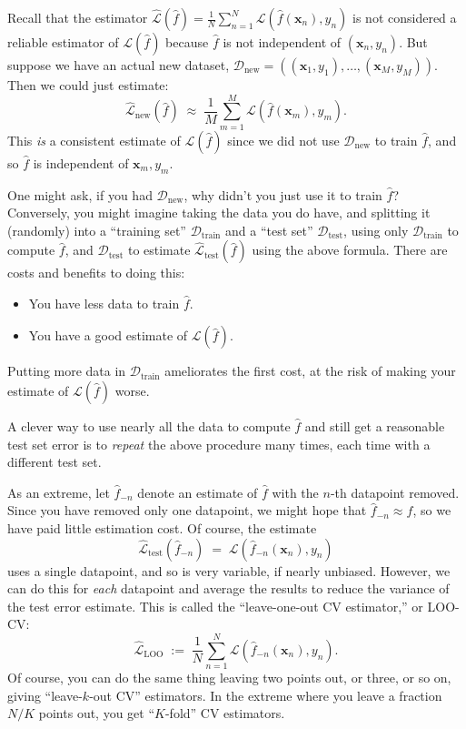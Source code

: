 Recall that the estimator
$\hat{\mathcal{L}}(\hat{f}) = \frac{1}{N}\sum_{n=1}^{N}
\mathcal{L}(\hat{f}(\boldsymbol{x}_n), y_n)$ is not considered a
reliable estimator of $\mathcal{L}(\hat{f})$ because $\hat{f}$ is
not independent of $(\boldsymbol{x}_n, y_n)$. But suppose we have
an actual new dataset,
$\mathcal{D}_{\text{new}} = ((\boldsymbol{x}_1, y_1), \ldots,
(\boldsymbol{x}_M, y_M))$. Then we could just estimate:
\[
  \hat{\mathcal{L}}_{\text{new}}(\hat{f})
  \;\approx\; \frac{1}{M}\sum_{m=1}^{M}
  \mathcal{L}(\hat{f}(\boldsymbol{x}_m), y_m).
\]
This \emph{is} a consistent estimate of $\mathcal{L}(\hat{f})$ since
we did not use $\mathcal{D}_{\text{new}}$ to train $\hat{f}$, and so
$\hat{f}$ is independent of $\boldsymbol{x}_m, y_m$.

One might ask, if you had $\mathcal{D}_{\text{new}}$, why didn't you
just use it to train $\hat{f}$? Conversely, you might imagine taking
the data you do have, and splitting it (randomly) into a ``training
set'' $\mathcal{D}_{\text{train}}$ and a ``test set''
$\mathcal{D}_{\text{test}}$, using only $\mathcal{D}_{\text{train}}$
to compute $\hat{f}$, and $\mathcal{D}_{\text{test}}$ to estimate
$\hat{\mathcal{L}}_{\text{test}}(\hat{f})$ using the above formula.
There are costs and benefits to doing this:
\begin{itemize}
  \item You have less data to train $\hat{f}$.
  \item You have a good estimate of $\mathcal{L}(\hat{f})$.
\end{itemize}
Putting more data in $\mathcal{D}_{\text{train}}$ ameliorates the
first cost, at the risk of making your estimate of
$\mathcal{L}(\hat{f})$ worse.

A clever way to use nearly all the data to compute $\hat{f}$ and
still get a reasonable test set error is to \emph{repeat} the above
procedure many times, each time with a different test set.

As an extreme, let $\hat{f}_{-n}$ denote an estimate of $\hat{f}$
with the $n$-th datapoint removed. Since you have removed only one
datapoint, we might hope that $\hat{f}_{-n} \approx \hat{f}$, so we
have paid little estimation cost. Of course, the estimate
\[
  \hat{\mathcal{L}}_{\text{test}}(\hat{f}_{-n})
  \;=\; \mathcal{L}(\hat{f}_{-n}(\boldsymbol{x}_n), y_n)
\]
uses a single datapoint, and so is very variable, if nearly
unbiased. However, we can do this for \emph{each} datapoint and
average the results to reduce the variance of the test error
estimate. This is called the ``leave-one-out CV estimator,'' or
LOO-CV:
\[
  \hat{\mathcal{L}}_{\text{LOO}}
  \;:=\; \frac{1}{N}\sum_{n=1}^{N}
  \mathcal{L}(\hat{f}_{-n}(\boldsymbol{x}_n), y_n).
\]
Of course, you can do the same thing leaving two points out, or
three, or so on, giving ``leave-$k$-out CV'' estimators. In the
extreme where you leave a fraction $N/K$ points out, you get
``$K$-fold'' CV estimators.

